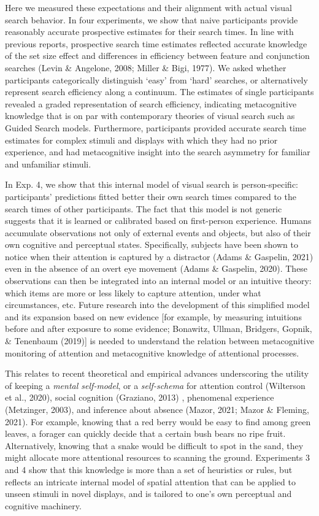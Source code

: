 \documentclass[12pt,twoside]{reedthesis}
\begin{document}
Here we measured these expectations and their alignment with actual visual search behavior. In four experiments, we show that naive participants provide reasonably accurate prospective estimates for their search times. In line with previous reports, prospective search time estimates reflected accurate knowledge of the set size effect and differences in efficiency between feature and conjunction searches (Levin \& Angelone, 2008; Miller \& Bigi, 1977). We asked whether participants categorically distinguish `easy' from `hard' searches, or alternatively represent search efficiency along a continuum. The estimates of single participants revealed a graded representation of search efficiency, indicating metacognitive knowledge that is on par with contemporary theories of visual search such as Guided Search models. Furthermore, participants provided accurate search time estimates for complex stimuli and displays with which they had no prior experience, and had metacognitive insight into the search asymmetry for familiar and unfamiliar stimuli.

In Exp. 4, we show that this internal model of visual search is person-specific: participants' predictions fitted better their own search times compared to the search times of other participants. The fact that this model is not generic suggests that it is learned or calibrated based on first-person experience. Humans accumulate observations not only of external events and objects, but also of their own cognitive and perceptual states. Specifically, subjects have been shown to notice when their attention is captured by a distractor (Adams \& Gaspelin, 2021) even in the absence of an overt eye movement (Adams \& Gaspelin, 2020). These observations can then be integrated into an internal model or an intuitive theory: which items are more or less likely to capture attention, under what circumstances, etc. Future research into the development of this simplified model and its expansion based on new evidence {[}for example, by measuring intuitions before and after exposure to some evidence; Bonawitz, Ullman, Bridgers, Gopnik, \& Tenenbaum (2019){]} is needed to understand the relation between metacognitive monitoring of attention and metacognitive knowledge of attentional processes.

This relates to recent theoretical and empirical advances underscoring the utility of keeping a \emph{mental self-model}, or a \emph{self-schema} for attention control (Wilterson et al., 2020), social cognition (Graziano, 2013) , phenomenal experience (Metzinger, 2003), and inference about absence (Mazor, 2021; Mazor \& Fleming, 2021). For example, knowing that a red berry would be easy to find among green leaves, a forager can quickly decide that a certain bush bears no ripe fruit. Alternatively, knowing that a snake would be difficult to spot in the sand, they might allocate more attentional resources to scanning the ground. Experiments 3 and 4 show that this knowledge is more than a set of heuristics or rules, but reflects an intricate internal model of spatial attention that can be applied to unseen stimuli in novel displays, and is tailored to one's own perceptual and cognitive machinery.
\end{document}
